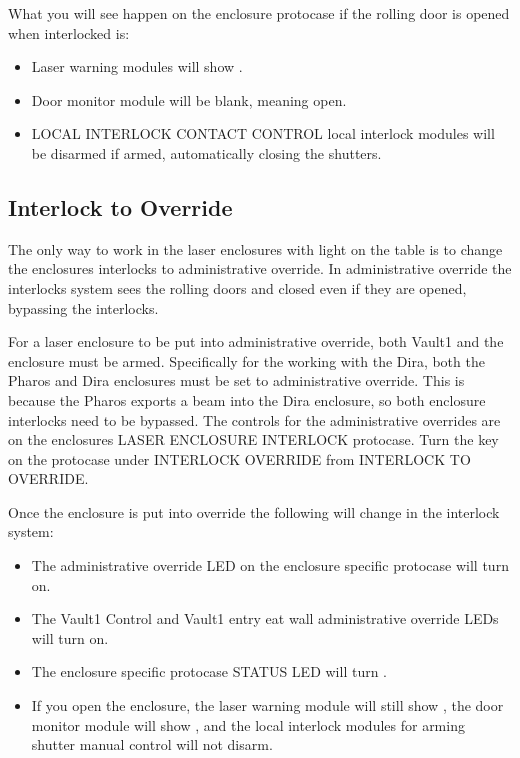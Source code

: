 \documentclass[letterpaper,10pt,english]{sphinxmanual}
\begin{document}
\sphinxAtStartPar
What you will see happen on the enclosure protocase if the rolling door is opened when interlocked is:
\begin{itemize}
\item {} 
\sphinxAtStartPar
Laser warning modules will show .

\item {} 
\sphinxAtStartPar
Door monitor module will be blank, meaning open.

\item {} 
\sphinxAtStartPar
LOCAL INTERLOCK CONTACT CONTROL local interlock modules will be disarmed if armed, automatically closing the shutters.

\end{itemize}


\subsection{Interlock to Override}
\label{\detokenize{user_documentation/Vault-1_laser:interlock-to-override}}
\sphinxAtStartPar
The only way to work in the laser enclosures with light on the table is to change the enclosures interlocks to administrative override.
In administrative override the interlocks system sees the rolling doors and closed even if they are opened, bypassing the interlocks.

\sphinxAtStartPar
For a laser enclosure to be put into administrative override, both Vault\sphinxhyphen{}1 and the enclosure must be armed.
Specifically for the working with the Dira, both the Pharos and Dira enclosures must be set to administrative override.
This is because the Pharos exports a beam into the Dira enclosure, so both enclosure interlocks need to be bypassed.
The controls for the administrative overrides are on the enclosures LASER ENCLOSURE INTERLOCK protocase.
Turn the key on the protocase under INTERLOCK OVERRIDE from INTERLOCK TO OVERRIDE.

\sphinxAtStartPar
Once the enclosure is put into override the following will change in the interlock system:
\begin{itemize}
\item {} 
\sphinxAtStartPar
The administrative override  LED on the enclosure specific protocase will turn on.

\item {} 
\sphinxAtStartPar
The Vault\sphinxhyphen{}1 Control and Vault\sphinxhyphen{}1 entry eat wall administrative override  LEDs will turn on.

\item {} 
\sphinxAtStartPar
The enclosure specific protocase STATUS LED will turn .

\item {} 
\sphinxAtStartPar
If you open the enclosure, the laser warning module will still show , the door monitor module will show , and the local interlock modules for arming shutter manual control will not disarm.

\end{itemize}
\end{document}
